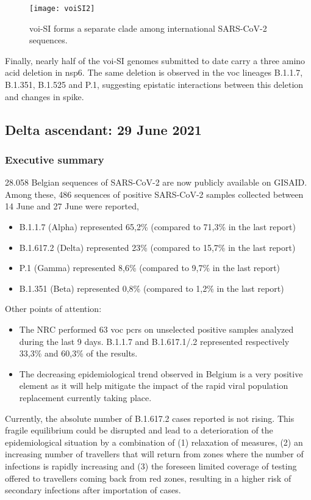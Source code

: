 \begin{figure}[ht]
  \centering
  \texttt{[image: voiSI2]}
  \caption[VOI-SI clade]{\gls{voi}-SI forms a separate clade among international SARS-CoV-2 sequences.}
  \label{fig:voiSI2}
\end{figure}

Finally, nearly half of the \gls{voi}-SI genomes submitted to date carry a three amino acid deletion in nsp6.
The same deletion is observed in the \gls{voc} lineages B.1.1.7, B.1.351, B.1.525 and P.1, suggesting epistatic interactions between this deletion and changes in spike.

\subsection{Delta ascendant: 29 June 2021}
\subsubsection{Executive summary}

28.058 Belgian sequences of SARS-CoV-2 are now publicly available on GISAID.
Among these, 486 sequences of positive SARS-CoV-2 samples collected between 14 June and 27 June were reported,
\begin{itemize}
  \item B.1.1.7 (Alpha) represented 65,2\% (compared to 71,3\% in the last report)
  \item B.1.617.2 (Delta) represented 23\% (compared to 15,7\% in the last report)
  \item P.1 (Gamma) represented 8,6\% (compared to 9,7\% in the last report)
  \item B.1.351 (Beta) represented 0,8\% (compared to 1,2\% in the last report)
\end{itemize}

Other points of attention:
\begin{itemize}
  \item The NRC performed 63 \gls{voc} \gls{pcr}s on unselected positive samples analyzed during the last 9 days.
B.1.1.7 and B.1.617.1/.2 represented respectively 33,3\% and 60,3\% of the results.
  \item The decreasing epidemiological trend observed in Belgium is a very positive element as it will help
mitigate the impact of the rapid viral population replacement currently taking place.
\end{itemize}

Currently, the absolute number of B.1.617.2 cases reported is not rising.
This fragile equilibrium could be disrupted and lead to a deterioration of the epidemiological situation by a combination of (1) relaxation of measures, (2) an increasing number of travellers that will return from zones where the number of infections is rapidly increasing and (3) the foreseen limited coverage of testing offered to travellers coming back from red zones, resulting in a higher risk of secondary infections after importation of cases.

